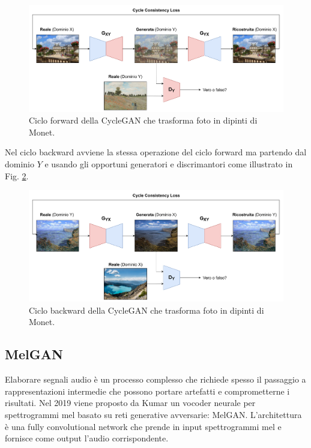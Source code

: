 			\begin{figure}%
				\centering
				\includegraphics[width=1\linewidth]{figures/cyclegan-A2B}
				\caption{Ciclo forward della CycleGAN che trasforma foto in dipinti di Monet.}
				\label{fig:cyclegan-forward}
			\end{figure}
			
			Nel ciclo backward avviene la stessa operazione del ciclo forward ma partendo dal dominio $Y$ e usando gli opportuni generatori e discrimantori come illustrato in Fig. \ref{fig:cyclegan-backward}.
			\begin{figure}%
			\centering
			\includegraphics[width=1\linewidth]{figures/cyclegan-B2A}
			\caption{Ciclo backward della CycleGAN che trasforma foto in dipinti di Monet.}
			\label{fig:cyclegan-backward}
			\end{figure}
	
		\subsection{MelGAN}
		Elaborare segnali audio è un processo complesso che richiede spesso il passaggio a rappresentazioni intermedie che possono portare artefatti e comprometterne i risultati.
		Nel 2019 viene proposto da Kumar un vocoder neurale per spettrogrammi mel basato su reti generative avversarie: MelGAN\cite{melgan}.
		L'architettura è una fully convolutional network che prende in input spettrogrammi mel e fornisce come output l'audio corrispondente.
		
